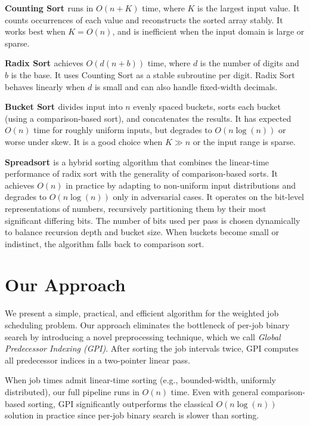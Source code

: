 \documentclass[final,5p,times]{elsarticle}
\begin{document}
\textbf{Counting Sort \cite{cormen2009}} runs in $O(n + K)$ time, where $K$ is the largest input value. It counts occurrences of each value and reconstructs the sorted array stably. It works best when $K = O(n)$, and is inefficient when the input domain is large or sparse.

\textbf{Radix Sort \cite{cormen2009}} achieves $O(d(n + b))$ time, where $d$ is the number of digits and $b$ is the base. It uses Counting Sort as a stable subroutine per digit. Radix Sort behaves linearly when $d$ is small and can also handle fixed-width decimals.

\textbf{Bucket Sort \cite{aho1983}} divides input into $n$ evenly spaced buckets, sorts each bucket (using a comparison-based sort), and concatenates the results. It has expected $O(n)$ time for roughly uniform inputs, but degrades to $O(n \log(n))$ or worse under skew. It is a good choice when $K \gg n$ or the input range is sparse.

\textbf{Spreadsort \cite{spreadsort2002}} is a hybrid sorting algorithm that combines the linear-time performance of radix sort with the generality of comparison-based sorts. It achieves $O(n)$ in practice by adapting to non-uniform input distributions and degrades to $O(n \log(n))$ only in adversarial cases. It operates on the bit-level representations of numbers, recursively partitioning them by their most significant differing bits. The number of bits used per pass is chosen dynamically to balance recursion depth and bucket size. When buckets become small or indistinct, the algorithm falls back to comparison sort.

\section{Our Approach}
\label{sec:approach}
We present a simple, practical, and efficient algorithm for the weighted job scheduling problem. Our approach eliminates the bottleneck of per-job binary search by introducing a novel preprocessing technique, which we call \textit{Global Predecessor Indexing (GPI)}. After sorting the job intervals twice, GPI computes all predecessor indices in a two-pointer linear pass.

When job times admit linear-time sorting (e.g., bounded-width, uniformly distributed), our full pipeline runs in $O(n)$ time. Even with general comparison-based sorting, GPI significantly outperforms the classical $O(n \log(n))$ solution in practice since per-job binary search is slower than sorting.
\end{document}

